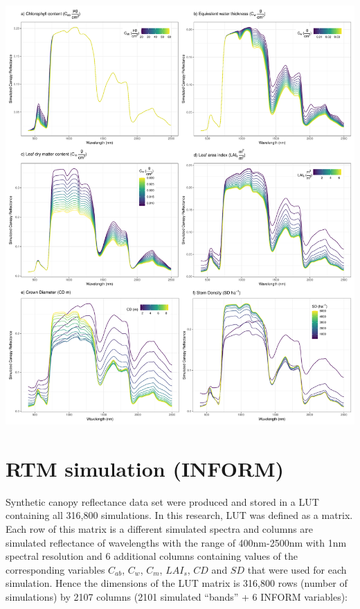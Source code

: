 \documentclass[a4paper, twoside]{templates/ociamthesis}
\let\origfigure\figure
\let\endorigfigure\endfigure
\renewenvironment{figure}[1][2] {
    \expandafter\origfigure\expandafter[H]
} {
    \endorigfigure
}
\begin{document}
\newpage

\begin{figure}

{\centering \includegraphics[height=0.8\textheight]{./figures/sensitivity_results} 

}

\caption{Effects of varying the chosen parameters on the simulated spectra}\label{fig:fsens}
\end{figure}

\newpage

\hypertarget{rtm-simulation-inform-1}{%
\section{RTM simulation (INFORM)}\label{rtm-simulation-inform-1}}

Synthetic canopy reflectance data set were produced and stored in a LUT containing all 316,800 simulations. In this research, LUT was defined as a matrix. Each row of this matrix is a different simulated spectra and columns are simulated reflectance of wavelengths with the range of 400nm-2500nm with 1nm spectral resolution and 6 additional columns containing values of the corresponding variables \(C_{ab}\), \(C_{w}\), \(C_{m}\), \(LAI_{s}\), \(CD\) and \(SD\) that were used for each simulation. Hence the dimensions of the LUT matrix is 316,800 rows (number of simulations) by 2107 columns (2101 simulated ``bands'' + 6 INFORM variables):
\end{document}
